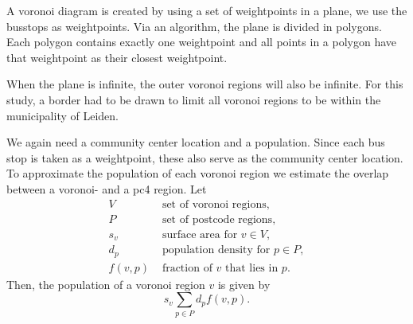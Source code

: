 A voronoi diagram is created by using a set of weightpoints in a plane, we use the busstops as weightpoints. Via an algorithm, the plane is divided in polygons. Each polygon contains exactly one weightpoint and all points in a polygon have that weightpoint as their closest weightpoint.

When the plane is infinite, the outer voronoi regions will also be infinite. For this study, a border had to be drawn to limit all voronoi regions to be within the municipality of Leiden.

We again need a community center location and a population. Since each bus stop is taken as a weightpoint, these also serve as the community center location. To approximate the population of each voronoi region we estimate the overlap between a voronoi- and a pc4 region. Let
\begin{align*}
    V       & \text{ set of voronoi regions},               \\
    P       & \text{ set of postcode regions},              \\
    s_v     & \text{ surface area for } v\in V,             \\
    d_p     & \text{ population density for } p\in P,       \\
    f(v, p) & \text{ fraction of }v \text{ that lies in }p.
\end{align*}
Then, the population of a voronoi region $v$ is given by
\begin{equation*}
    s_v \sum_{p\in P} d_p f(v,p).
\end{equation*}



